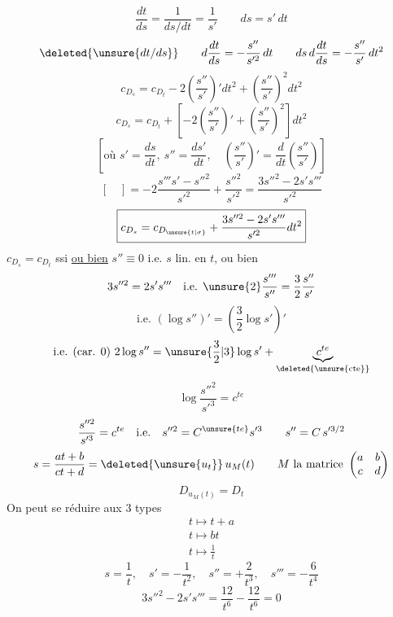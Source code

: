 \[
\frac{dt}{ds}=\frac1{ds/dt}=\frac1{s'}\qquad ds=s'\,dt
\]
\[
\deleted{\unsure{dt/ds}}\qquad d\frac{dt}{ds}=-\frac{s''}{s'^2}\,dt
\qquad ds\,d\frac{dt}{ds}=-\frac{s''}{s'}\,dt^2
\]
\[
c_{D_s}=c_{D_t}-2\left(\frac{s''}{s'}\right)'dt^2+\left(\frac{s''}{s'}\right)^2dt^2
\]
\[
\boxed{c_{D_s}=c_{D_t}+\left[-2\left(\frac{s''}{s'}\right)'+\left(\frac{s''}{s'}\right)^2\right]dt^2}
\]
\[
\left[\text{où }s'=\frac{ds}{dt},\ s''=\frac{ds'}{dt},\quad
\left(\frac{s''}{s'}\right)'=\frac d{dt}\left(\frac{s''}{s'}\right)\right]
\]
\[
[\quad]=-2\frac{s'''s'-s''^2}{s'^2}+\frac{s''^2}{s'^2}
=\frac{3s''^2-2s's'''}{s'^2}
\]
\[
\boxed{c_{D_s}=c_{D_{\unsure{t|\sigma}}}+\frac{3s''^2-2s's'''}{s'^2}dt^2}
\]
 $c_{D_s}=c_{D_t}$ ssi \uline{ou bien} $s''\equiv0$ i.e. $s$ lin. en $t$, ou bien
\[
3s''^2=2s's'''\quad\text{i.e. }\unsure{2}\frac{s'''}{s''}=\frac32\frac{s''}{s'}
\]
\[
\text{i.e. }(\log s'')'=\left(\frac32\log s'\right)'
\]
\[
\text{i.e. (car. 0) }2\log s''=\unsure{\frac32|3}\log s'+\underbrace{c^{te}}_{\deleted{\unsure{\mathrm{cte}}}}
\]
\[
\log\frac{s''^2}{s'^3}=c^{te}
\]
\[
\frac{s''^2}{s'^3}=c^{te}\quad\text{i.e.}\quad s''^2=C^{\unsure{te}}s'^3
\qquad s''=C\,s'^{3/2}
\]
\[
s=\frac{at+b}{ct+d}=\deleted{\unsure{u_t}}\,u_M(t)\qquad
M\text{ la matrice }\begin{pmatrix}a&b\\c&d\end{pmatrix}
\]
\[
D_{u_M(t)}=D_t
\]
On peut se réduire aux 3 types 
\[
\begin{gathered}
t\longmapsto t+a\\
t\longmapsto bt\\
t\longmapsto\frac1t
\end{gathered}
\]
\[
s=\frac1t,\quad s'=-\frac1{t^2},\quad s''=+\frac2{t^3},\quad s'''=-\frac6{t^4}
\]
\[
3s''^2-2s's'''=\frac{12}{t^6}-\frac{12}{t^6}=0
\]
